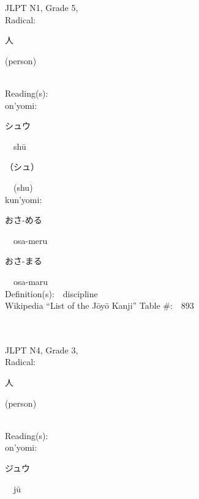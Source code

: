 \begin{multicols}{2}
{JLPT N1, Grade 5, \\Radical:\ \ {\begin{CJK}{UTF8}{min} 人 \end{CJK}} (person) } \\
Reading(s):\ \ \\
{\hspace*{1em}}on'yomi:\ \ \\
{\hspace*{2em}}{\begin{CJK}{UTF8}{min} シュウ \end{CJK}}\ \ sh\=u\ \ \\
{\hspace*{2em}}{\begin{CJK}{UTF8}{min} （シュ） \end{CJK}}\ \ (shu)\ \ \\
{\hspace*{1em}}kun'yomi:\ \ \\
{\hspace*{2em}}{\begin{CJK}{UTF8}{min} おさ-める \end{CJK}}\ \ osa-meru\ \ \\
{\hspace*{2em}}{\begin{CJK}{UTF8}{min} おさ-まる \end{CJK}}\ \ osa-maru\ \ \\
Definition(s):\ \ discipline \\
Wikipedia ``List of the J\=oy\=o Kanji'' Table \#:\ \ 893 \\
\ \ \\
{\fontsize{34pt}{40pt}  }\ \ \\  %
{JLPT N4, Grade 3, \\Radical:\ \ {\begin{CJK}{UTF8}{min} 人 \end{CJK}} (person) } \\
Reading(s):\ \ \\
{\hspace*{1em}}on'yomi:\ \ \\
{\hspace*{2em}}{\begin{CJK}{UTF8}{min} ジュウ \end{CJK}}\ \ j\=u\ \ \\

\end{multicols}
